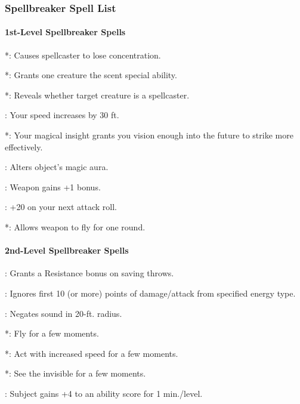 \subsubsection{Spellbreaker Spell List}
\paragraph{1st-Level Spellbreaker Spells}
\begin{list}{}{\leftmargin=1em}
  \item {}*: Causes spellcaster to lose concentration.
  \item {}*: Grants one creature the scent special ability.
  \item {}*: Reveals whether target creature is a spellcaster.
  \item {}: Your speed increases by 30 ft.
  \item {}*: Your magical insight grants you vision enough into the future to strike more effectively.
  \item {}: Alters object's magic aura.
  \item {}: Weapon gains +1 bonus.
  \item {}: +20 on your next attack roll.
  \item {}*: Allows weapon to fly for one round.
\end{list}
\paragraph{2nd-Level Spellbreaker Spells}
\begin{list}{}{\leftmargin=1em}
  \item {} : Grants a Resistance bonus on saving throws.
  \item {}: Ignores first 10 (or more) points of damage/attack from specified energy type.
  \item {}: Negates sound in 20-ft. radius.
  \item {}*: Fly for a few moments.
  \item {}*: Act with increased speed for a few moments.
  \item {}*: See the invisible for a few moments.
  \item {}: Subject gains +4 to an ability score for 1 min./level.
\end{list}
